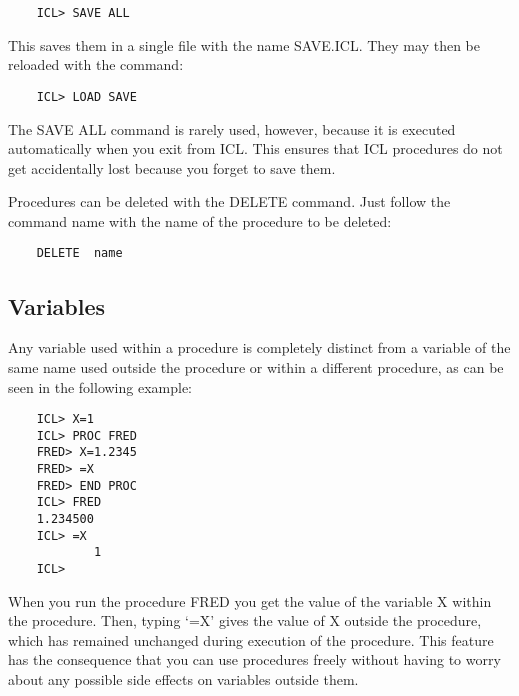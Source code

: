 \begin{small}
\begin{verbatim}
    ICL> SAVE ALL
\end{verbatim}
\end{small}

This saves them in a single file with the name SAVE.ICL.
They may then be reloaded with the command:

\begin{small}
\begin{verbatim}
    ICL> LOAD SAVE
\end{verbatim}
\end{small}

The SAVE ALL command is rarely used, however, because it is executed
automatically when you exit from ICL.
This ensures that ICL procedures do not get accidentally lost because you
forget to save them.

Procedures can be deleted with the DELETE command.
Just follow the command name with the name of the procedure to be deleted:

\begin{small}
\begin{verbatim}
    DELETE  name
\end{verbatim}
\end{small}


\subsection{Variables}

Any variable used within a procedure is completely distinct from a variable of
the same name used outside the procedure or within a different procedure, as
can be seen in the following example:

\begin{small}
\begin{verbatim}
    ICL> X=1
    ICL> PROC FRED
    FRED> X=1.2345
    FRED> =X
    FRED> END PROC
    ICL> FRED
    1.234500
    ICL> =X
            1
    ICL>
\end{verbatim}
\end{small}

When you run the procedure FRED you get the value of the variable X within the
procedure.
Then, typing `=X' gives the value of X outside the procedure, which has remained
unchanged during execution of the procedure.
This feature has the consequence that you can use procedures freely without
having to worry about any possible side effects on variables outside them.

